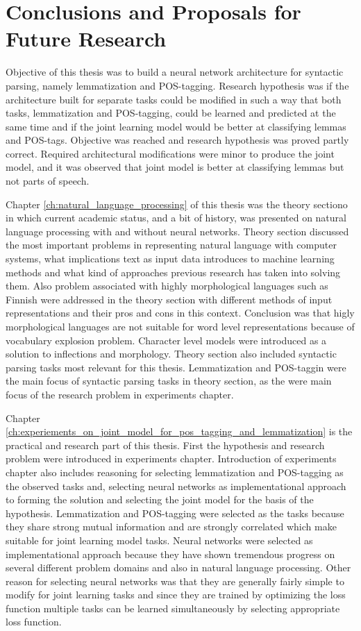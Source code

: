 \documentclass[12pt,a4paper,english
]{tutthesis}
\begin{document}
\chapter{Conclusions and Proposals for Future Research}
\label{ch:conclusions}
Objective of this thesis was to build a neural network architecture for syntactic parsing, namely lemmatization and POS-tagging. Research hypothesis was if the architecture built for separate tasks could be modified in such a way that both tasks, lemmatization and POS-tagging, could be learned and predicted at the same time and if the joint learning model would be better at classifying lemmas and POS-tags. Objective was reached and research hypothesis was proved partly correct. Required architectural modifications were minor to produce the joint model, and it was observed that joint model is better at classifying lemmas but not parts of speech.

Chapter \ref{ch:natural_language_processing} of this thesis was the theory sectiono in which current academic status, and a bit of history, was presented on natural language processing with and without neural networks. Theory section discussed the most important problems in representing natural language with computer systems, what implications text as input data introduces to machine learning methods and what kind of approaches previous research has taken into solving them. Also problem associated with highly morphological languages such as Finnish were addressed in the theory section with different methods of input representations and their pros and cons in this context. Conclusion was that higly morphological languages are not suitable for word level representations because of vocabulary explosion problem. Character level models were introduced as a solution to inflections and morphology. Theory section also included syntactic parsing tasks most relevant for this thesis. Lemmatization and POS-taggin were the main focus of syntactic parsing tasks in theory section, as the were main focus of the research problem in experiments chapter.

Chapter \ref{ch:experiements_on_joint_model_for_pos_tagging_and_lemmatization} is the practical and research part of this thesis. First the hypothesis and research problem were introduced in experiments chapter. Introduction of experiments chapter also includes reasoning for selecting lemmatization and POS-tagging as the observed tasks and, selecting neural networks as implementational approach to forming the solution and selecting the joint model for the basis of the hypothesis. Lemmatization and POS-tagging were selected as the tasks because they share strong mutual information and are strongly correlated which make suitable for joint learning model tasks. Neural networks were selected as implementational approach because they have shown tremendous progress on several different problem domains and also in natural language processing. Other reason for selecting neural networks was that they are generally fairly simple to modify for joint learning tasks and since they are trained by optimizing the loss function multiple tasks can be learned simultaneously by selecting appropriate loss function.
\end{document}
